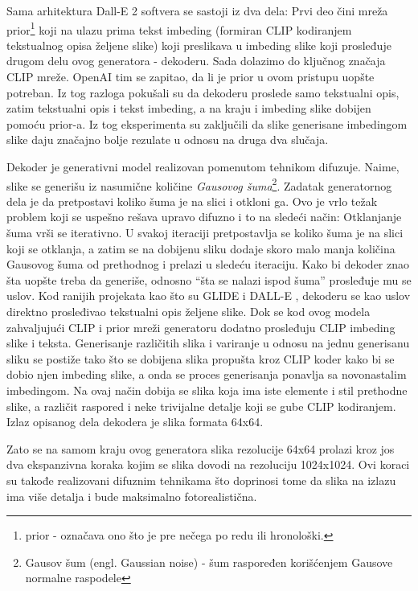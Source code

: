 \documentclass[12pt, letterpaper]{article}
\begin{document}
Sama arhitektura Dall-E 2 softvera se sastoji iz dva dela: Prvi deo čini mreža prior\footnote{prior - označava ono što je pre nečega po redu ili hronološki.} koji na ulazu prima tekst imbeding (formiran CLIP kodiranjem tekstualnog opisa željene slike) koji preslikava u imbeding slike koji prosleđuje drugom delu ovog generatora - dekoderu. Sada dolazimo do ključnog značaja CLIP mreže. OpenAI tim se zapitao, da li je prior u ovom pristupu uopšte potreban. Iz tog razloga pokušali su da dekoderu proslede samo tekstualni opis, zatim tekstualni opis i tekst imbeding, a na kraju i imbeding slike dobijen pomoću prior-a. Iz tog eksperimenta su zaključili da slike generisane imbedingom slike daju značajno bolje rezulate u odnosu na druga dva slučaja.

Dekoder je generativni model realizovan pomenutom tehnikom difuzuje. Naime, slike se generišu iz nasumične količine \textit{Gausovog šuma}\footnote{Gausov šum (engl. Gaussian noise) - šum raspoređen korišćenjem Gausove normalne raspodele}. Zadatak generatornog dela je da pretpostavi koliko šuma je na slici i otkloni ga. Ovo je vrlo težak problem koji se uspešno rešava upravo difuzno i to na sledeći način: Otklanjanje šuma vrši se iterativno. U svakoj iteraciji pretpostavlja se koliko šuma je na slici koji se otklanja, a zatim se na dobijenu sliku dodaje skoro malo manja količina Gausovog šuma od prethodnog i prelazi u sledeću iteraciju. Kako bi dekoder znao šta uopšte treba da generiše, odnosno “šta se nalazi ispod šuma” prosleđuje mu se uslov. Kod ranijih projekata kao što su GLIDE i DALL-E \cite{openai_glide}, dekoderu se kao uslov direktno prosleđivao tekstualni opis željene slike. Dok se kod ovog modela zahvaljujući CLIP i prior mreži generatoru dodatno prosleđuju CLIP imbeding slike i teksta. Generisanje različitih slika i variranje u odnosu na jednu generisanu sliku se postiže tako što se dobijena slika propušta kroz CLIP koder kako bi se dobio njen imbeding slike, a onda se proces generisanja ponavlja sa novonastalim imbedingom. Na ovaj način dobija se slika koja ima iste elemente i stil prethodne slike, a različit raspored i neke trivijalne detalje koji se gube CLIP kodiranjem. Izlaz opisanog dela dekodera je slika formata 64x64\cite{openai_dali}.

Zato se na samom kraju ovog generatora slika rezolucije 64x64 prolazi kroz jos dva ekspanzivna koraka kojim se slika dovodi na rezoluciju 1024x1024. Ovi koraci su takođe realizovani difuznim tehnikama što doprinosi tome da slika na izlazu ima više detalja i bude maksimalno fotorealistična.
\end{document}
